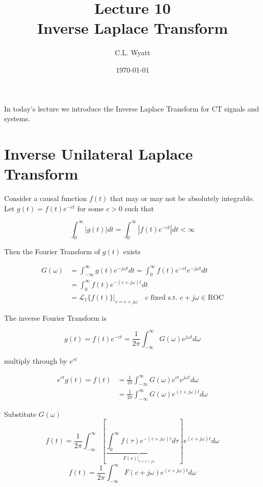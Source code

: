 \documentclass{article}
\begin{document}
\title{Lecture 10\\ Inverse Laplace Transform}
\author{C.L. Wyatt}
\date{\today}
\maketitle

In today's lecture we introduce the Inverse Laplace Transform for CT signals and systems.

\section{Inverse Unilateral Laplace Transform}

Consider a causal function $f(t)$ that may or may not be absolutely integrable. Let $g(t)=f(t) e^{-c t}$ for some $c>0$ such that

$$
\int_{0}^{\infty}|g(t)| dt = \int_{0}^{\infty}\left|f(t) e^{-c t}\right| dt < \infty
$$

Then the Fourier Transform of $g(t)$ exists

$$
\begin{aligned}
G(\omega) & =\int_{-\infty}^{\infty} g(t) e^{-j \omega t} dt = \int_{0}^{\infty} f(t) e^{-c t} e^{-j \omega t} dt \\
& =\int_{0}^{\infty} f(t) e^{-(c+j \omega) t} dt \\
& =\left.\mathcal{L}_{1}\{f(t)\}\right|_{s = c+j\omega} \quad c \text{ fixed s.t. } c+j\omega \in \text{ROC}
\end{aligned}
$$

The inverse Fourier Transform is

$$
g(t)=f(t) e^{-c t}=\frac{1}{2 \pi} \int_{-\infty}^{\infty} G(\omega) e^{j \omega t} d\omega
$$

multiply through by $e^{c t}$

$$
\begin{aligned}
e^{c t} g(t)=f(t) & =\frac{1}{2 \pi} \int_{-\infty}^{\infty} G(\omega) e^{c t} e^{j \omega t} d\omega \\
& =\frac{1}{2 \pi} \int_{-\infty}^{\infty} G(\omega) e^{(c+j \omega) t} d\omega
\end{aligned}
$$

Substitute $G(\omega)$\\
$$
f(t)=\frac{1}{2 \pi} \int_{-\infty}^{\infty}\left[\underbrace{\int_{0}^{\infty} f(\tau) e^{-(c+j \omega) \tau}}_{\left.F(s)\right|_{s=c+j \omega}} d\tau\right] e^{(c+j \omega) t} d \omega
$$
$$
f(t)=\frac{1}{2 \pi} \int_{-\infty}^{\infty} F(c+j \omega) e^{(c+j \omega) t} d \omega
$$
\end{document}
